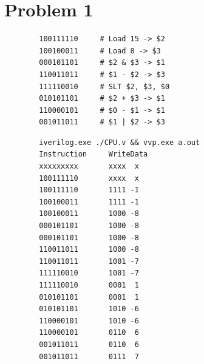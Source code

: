 \documentclass{article}
\newenvironment{problem}[1]{
  \nobreak\section*{Problem #1}
}{}
\begin{document}
\begin{problem}{1}
    \begin{center}
      \begin{lstlisting}
        100111110     # Load 15 -> $2
        100100011     # Load 8 -> $3
        000101101     # $2 & $3 -> $1
        110011011     # $1 - $2 -> $3
        111110010     # SLT $2, $3, $0
        010101101     # $2 + $3 -> $1
        110000101     # $0 - $1 -> $1
        001011011     # $1 | $2 -> $3
      \end{lstlisting}
    \end{center}

    \begin{center}
      \begin{lstlisting}
        iverilog.exe ./CPU.v && vvp.exe a.out
        Instruction     WriteData
        xxxxxxxxx       xxxx  x
        100111110       xxxx  x
        100111110       1111 -1
        100100011       1111 -1
        100100011       1000 -8
        000101101       1000 -8
        000101101       1000 -8
        110011011       1000 -8
        110011011       1001 -7
        111110010       1001 -7
        111110010       0001  1
        010101101       0001  1
        010101101       1010 -6
        110000101       1010 -6
        110000101       0110  6
        001011011       0110  6
        001011011       0111  7
      \end{lstlisting}
    \end{center}
  \end{problem}
\end{document}
